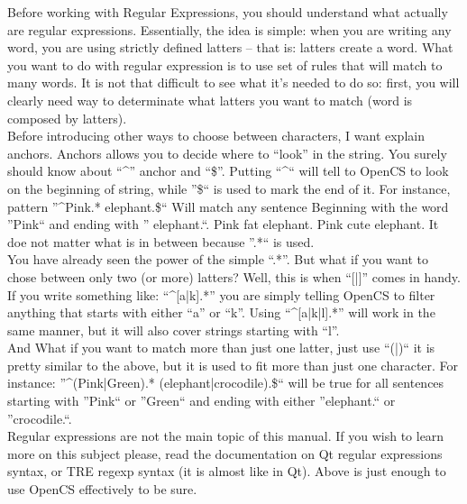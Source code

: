 Before working with Regular Expressions, you should understand what actually are regular expressions. Essentially, the idea is simple: when you are writing any word, you are using strictly defined latters -- that is: latters create a word. What you want to do with regular expression is to use set of rules that will match to many words. It is not that difficult to see what it's needed to do so: first, you will clearly need way to determinate what latters you want to match (word is composed by latters).\\

Before introducing other ways to choose between characters, I want explain anchors. Anchors allows you to decide where to ``look'' in the string. You surely should know about ``^'' anchor and ``\$''. Putting ``^`` will tell to Open{CS} to look on the beginning of string, while ''\$`` is used to mark the end of it. For instance, pattern ''^Pink.* elephant.\$`` Will match any sentence Beginning with the word ''Pink`` and ending with '' elephant.``. Pink fat elephant. Pink cute elephant. It doe not matter what is in between because ''.*`` is used.\\

You have already seen the power of the simple ``.*''. But what if you want to chose between only two (or more) latters? Well, this is when ``[|]'' comes in handy. If you write something like: ``^[a|k].*'' you are simply telling Open{CS} to filter anything that starts with either ``a'' or ``k''. Using ``^[a|k|l].*'' will work in the same manner, but it will also cover strings starting with ``l''.\\

And What if you want to match more than just one latter, just use ``(|)`` it is pretty similar to the above, but it is used to fit more than just one character. For instance: ''^(Pink|Green).* (elephant|crocodile).\$`` will be true for all sentences starting with ''Pink`` or ''Green`` and ending with either ''elephant.`` or ''crocodile.``.\\

Regular expressions are not the main topic of this manual. If you wish to learn more on this subject please, read the documentation on Qt regular expressions syntax, or TRE regexp syntax (it is almost like in Qt). Above is just enough to use Open{CS} effectively to be sure.

